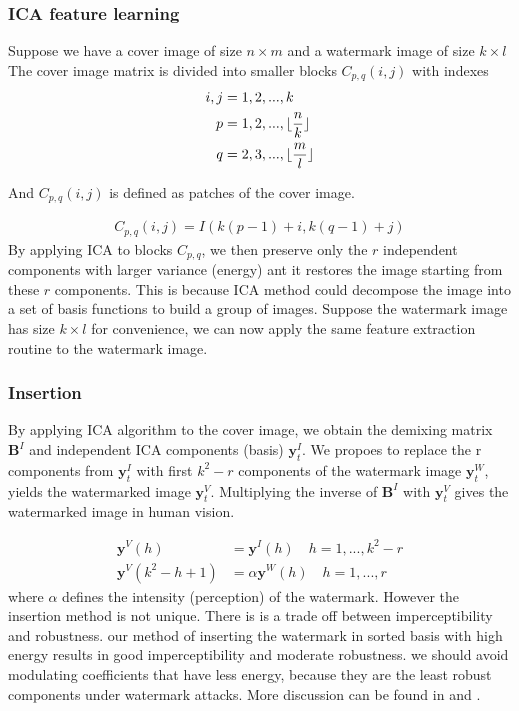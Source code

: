 \subsubsection{ICA feature learning}
Suppose we have a cover image of size $n\times m$ and a watermark image of size $k\times l$ The cover image matrix is divided into smaller blocks $C_{p,q}(i,j)$ with indexes
\begin{align}
    i,j &= 1,2,...,k\\
    p &= 1,2,...,\lfloor\frac{n}{k}\rfloor\\ 
    q &= 2,3,...,\lfloor\frac{m}{l}\rfloor 
\end{align}

And $C_{p,q}(i,j)$ is defined as patches of the cover image.

\begin{align}
    C_{p,q}(i,j) = I(k(p-1)+i, k(q-1)+j)
\end{align}
By applying ICA to blocks $C_{p,q}$, we then preserve only the $r$ independent components with larger variance (energy) ant it restores the image starting from these $r$ components. This is because ICA method could decompose the image into a set of basis functions to build a group of images. Suppose the watermark image has size $k \times l$ for convenience, we can now apply the same feature extraction routine to the watermark image.

\subsubsection{Insertion}
By applying ICA algorithm to the cover image, we obtain the demixing matrix $\mathbf{B}^I$ and independent ICA components (basis) $\mathbf{y}^I_t$. 
We propoes to replace the r components from $\mathbf{y}^I_t$ with first $k^2 -r$ components of the watermark image $\mathbf{y}^W_t$, yields the watermarked image  $\mathbf{y}^V_t$. Multiplying the inverse of $\mathbf{B}^I$ with $\mathbf{y}^V_t$ gives the watermarked image in human vision. 

\begin{align}
    \mathbf{y}^V(h) &=  \mathbf{y}^I(h) \quad h = 1,...,k^2-r \\
    \mathbf{y}^V(k^2-h+1) &= \alpha  \mathbf{y}^W(h) \quad h = 1,...,r
\end{align}
where $\alpha$ defines the intensity (perception) of the watermark. However the insertion method is not unique. 
There is is a trade off between imperceptibility and robustness. 
our method of inserting the watermark in sorted basis with high energy results in good imperceptibility and moderate robustness.
we should avoid modulating coefficients that have less energy, because they are the least robust components under watermark attacks. More discussion can be found in \cite{LuWei_ICA} and \cite{Yu2017}.

